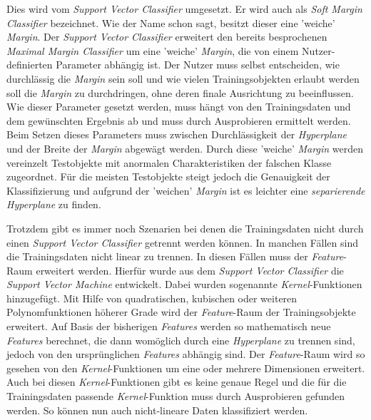 Dies wird vom \textit{Support Vector Classifier} umgesetzt. Er wird auch als \textit{Soft Margin Classifier} bezeichnet.
Wie der Name schon sagt, besitzt dieser eine 'weiche' \textit{Margin}. 
Der \textit{Support Vector Classifier} erweitert den bereits besprochenen \textit{Maximal Margin Classifier}
um eine 'weiche' \textit{Margin}, die von einem Nutzer-definierten Parameter abhängig ist.
Der Nutzer muss selbst entscheiden, wie durchlässig die \textit{Margin} sein soll und
wie vielen Trainingsobjekten erlaubt werden soll die \textit{Margin} zu durchdringen, ohne deren finale Ausrichtung zu beeinflussen.
Wie dieser Parameter gesetzt werden, muss hängt von den Trainingsdaten und dem gewünschten Ergebnis ab
und muss durch Ausprobieren ermittelt werden.
Beim Setzen dieses Parameters muss zwischen Durchlässigkeit der \textit{Hyperplane} und der Breite der \textit{Margin} abgewägt werden.
Durch diese 'weiche' \textit{Margin} werden vereinzelt Testobjekte mit anormalen Charakteristiken der falschen Klasse
zugeordnet. Für die meisten Testobjekte steigt jedoch die Genauigkeit der Klassifizierung und aufgrund der 'weichen' \textit{Margin}
ist es leichter eine \textit{separierende Hyperplane} zu finden.\cite[S. 1566]{noble_2006}

Trotzdem gibt es immer noch Szenarien bei denen die Trainingsdaten nicht durch einen \textit{Support Vector Classifier} getrennt
werden können. In manchen Fällen sind die Trainingsdaten nicht linear zu trennen.
In diesen Fällen muss der \textit{Feature}-Raum erweitert werden. Hierfür wurde aus dem \textit{Support Vector Classifier}
die \textit{Support Vector Machine} entwickelt. Dabei wurden sogenannte \textit{Kernel}-Funktionen hinzugefügt.
Mit Hilfe von quadratischen, kubischen oder weiteren Polynomfunktionen höherer Grade wird der \textit{Feature}-Raum der
Trainingsobjekte erweitert. Auf Basis der bisherigen \textit{Features} werden so mathematisch neue \textit{Features} berechnet, die 
dann womöglich durch eine \textit{Hyperplane} zu trennen sind, jedoch von den ursprünglichen \textit{Features} abhängig sind.
Der \textit{Feature}-Raum wird so gesehen von den \textit{Kernel}-Funktionen um eine oder mehrere Dimensionen erweitert.
Auch bei diesen \textit{Kernel}-Funktionen gibt es keine genaue Regel und die für die Trainingsdaten passende 
\textit{Kernel}-Funktion muss durch Ausprobieren gefunden werden. So können nun auch nicht-lineare Daten klassifiziert werden.
\cite[S. 1566f.]{noble_2006}\cite[S. 224 - 227]{suthaharan_2015}

